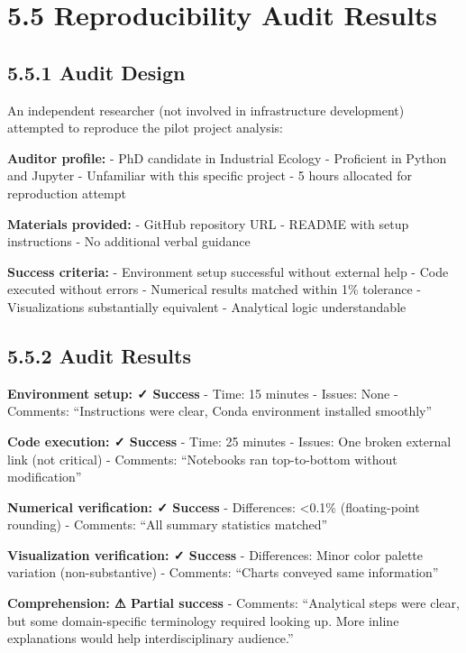 \documentclass[
  oneside,
  open=any]{scrbook}
\begin{document}
\section{5.5 Reproducibility Audit
Results}\label{reproducibility-audit-results}

\subsection{5.5.1 Audit Design}\label{audit-design}

An independent researcher (not involved in infrastructure development)
attempted to reproduce the pilot project analysis:

\textbf{Auditor profile:} - PhD candidate in Industrial Ecology -
Proficient in Python and Jupyter - Unfamiliar with this specific project
- 5 hours allocated for reproduction attempt

\textbf{Materials provided:} - GitHub repository URL - README with setup
instructions - No additional verbal guidance

\textbf{Success criteria:} - Environment setup successful without
external help - Code executed without errors - Numerical results matched
within 1\% tolerance - Visualizations substantially equivalent -
Analytical logic understandable

\subsection{5.5.2 Audit Results}\label{audit-results}

\textbf{Environment setup: ✓ Success} - Time: 15 minutes - Issues: None
- Comments: ``Instructions were clear, Conda environment installed
smoothly''

\textbf{Code execution: ✓ Success} - Time: 25 minutes - Issues: One
broken external link (not critical) - Comments: ``Notebooks ran
top-to-bottom without modification''

\textbf{Numerical verification: ✓ Success} - Differences: \textless0.1\%
(floating-point rounding) - Comments: ``All summary statistics matched''

\textbf{Visualization verification: ✓ Success} - Differences: Minor
color palette variation (non-substantive) - Comments: ``Charts conveyed
same information''

\textbf{Comprehension: ⚠ Partial success} - Comments: ``Analytical steps
were clear, but some domain-specific terminology required looking up.
More inline explanations would help interdisciplinary audience.''
\end{document}
